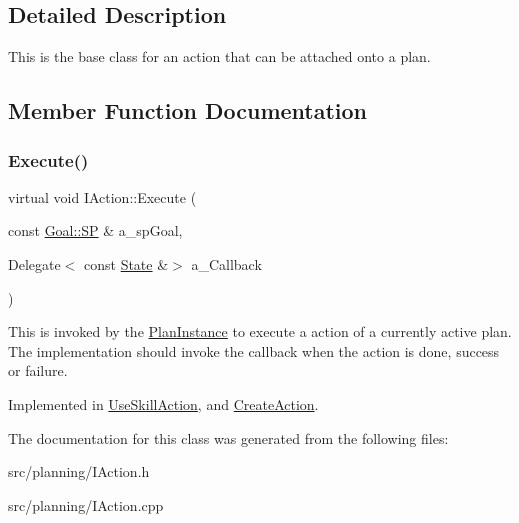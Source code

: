 \subsection{Detailed Description}
This is the base class for an action that can be attached onto a plan. 

\subsection{Member Function Documentation}
\mbox{\label{class_i_action_aef670368aadfdf1a45d2ec845dfc2277}} 
\subsubsection{\texorpdfstring{Execute()}{Execute()}}
{\footnotesize\ttfamily virtual void I\+Action\+::\+Execute (\begin{DoxyParamCaption}\item[{const \hyperlink{class_goal_a818ae12a4d1f28bd433dab2a830a390e}{Goal\+::\+SP} \&}]{a\+\_\+sp\+Goal,  }\item[{Delegate$<$ const \hyperlink{struct_i_action_1_1_state}{State} \&$>$}]{a\+\_\+\+Callback }\end{DoxyParamCaption})\hspace{0.3cm}{\ttfamily [pure virtual]}}

This is invoked by the \hyperlink{class_plan_instance}{Plan\+Instance} to execute a action of a currently active plan. The implementation should invoke the callback when the action is done, success or failure. 

Implemented in \hyperlink{class_use_skill_action_aad5962d4cce5d3f8e5b16b19639625e8}{Use\+Skill\+Action}, and \hyperlink{class_create_action_ac23070e18aa583e373a9e26c7ab6d3a8}{Create\+Action}.



The documentation for this class was generated from the following files\+:\begin{DoxyCompactItemize}
\item 
src/planning/I\+Action.\+h\item 
src/planning/I\+Action.\+cpp\end{DoxyCompactItemize}
